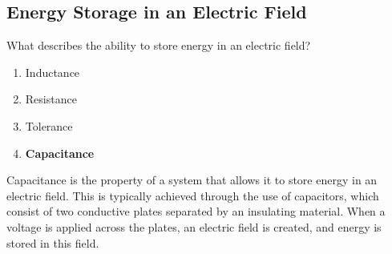 \subsection{Energy Storage in an Electric Field}
\label{T5C01}

\begin{tcolorbox}[colback=gray!10!white,colframe=black!75!black,title=T5C01]
What describes the ability to store energy in an electric field?
\begin{enumerate}[noitemsep]
    \item Inductance
    \item Resistance
    \item Tolerance
    \item \textbf{Capacitance}
\end{enumerate}
\end{tcolorbox}

Capacitance is the property of a system that allows it to store energy in an electric field. This is typically achieved through the use of capacitors, which consist of two conductive plates separated by an insulating material. When a voltage is applied across the plates, an electric field is created, and energy is stored in this field.